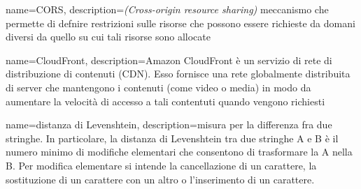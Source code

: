 {
	name=CORS,
	description={\emph{(Cross-origin resource sharing)} meccanismo che permette di defnire restrizioni sulle risorse
	che possono essere richieste da domani diversi da quello su cui tali risorse sono allocate}
}

{
	name=CloudFront,
	description={Amazon CloudFront è un servizio di rete di distribuzione di contenuti (CDN). Esso fornisce una rete 
	globalmente distribuita di server che mantengono i contenuti (come video o media) in modo da aumentare la velocità di accesso a tali contentuti quando vengono richiesti}
}

{
	name=distanza di Levenshtein,
	description={misura per la differenza fra due stringhe. In particolare, la distanza di Levenshtein tra due stringhe
	A e B è il numero minimo di modifiche elementari che consentono di trasformare la A nella B. Per modifica elementare si intende la cancellazione di un carattere, la sostituzione di un carattere con un altro o l'inserimento di un carattere.}
}